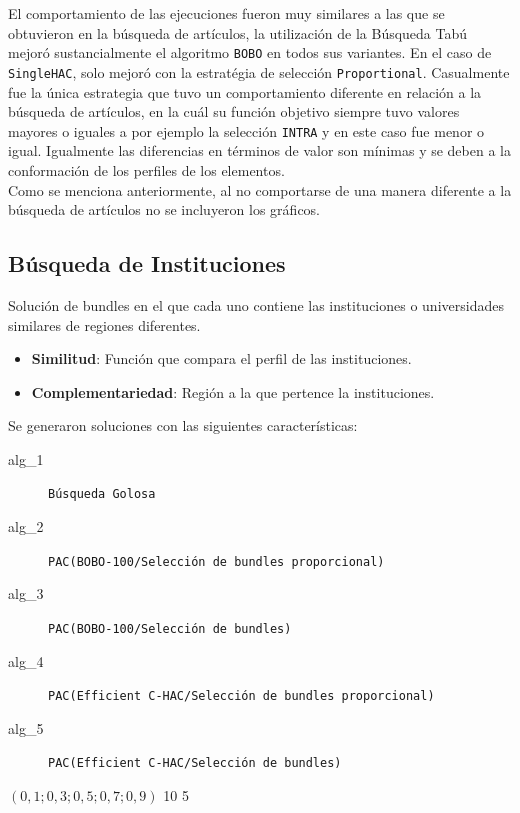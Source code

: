 El comportamiento de las ejecuciones fueron muy similares a las que se obtuvieron en la búsqueda de artículos, la utilización de la Búsqueda Tabú mejoró sustancialmente el algoritmo \texttt{BOBO} en todos sus variantes. En el caso de \texttt{SingleHAC}, solo mejoró con la estratégia de selección \texttt{Proportional}. Casualmente fue la única estrategia que tuvo un comportamiento diferente en relación a la búsqueda de artículos, en la cuál su función objetivo siempre tuvo valores mayores o iguales a por ejemplo la selección \texttt{INTRA} y en este caso fue menor o igual. Igualmente las diferencias en términos de valor son mínimas y se deben a la conformación de los perfiles de los elementos.\\
Como se menciona anteriormente, al no comportarse de una manera diferente a la búsqueda de artículos no se incluyeron los gráficos.
\newpage
\subsection{Búsqueda de Instituciones}\label{res:busInstituciones}
Solución de bundles en el que cada uno contiene las instituciones o universidades similares de regiones diferentes.\\
\begin{itemize}
  \item \textbf{Similitud}: Función que compara el perfil de las instituciones.
  \item \textbf{Complementariedad}: Región a la que pertence la instituciones.
\end{itemize}
Se generaron soluciones con las siguientes características:\\
\Solucion
{}
{
\begin{description}
	\item[alg\_1] \texttt{Búsqueda Golosa}
	\item[alg\_2] \texttt{PAC(BOBO-100/Selección de bundles proporcional)}
	\item[alg\_3] \texttt{PAC(BOBO-100/Selección de bundles)}
	\item[alg\_4] \texttt{PAC(Efficient C-HAC/Selección de bundles proporcional)}
	\item[alg\_5] \texttt{PAC(Efficient C-HAC/Selección de bundles)}
\end{description}
}
{$(0,1; 0,3; 0,5; 0,7; 0,9)$}
{10}
{5}

